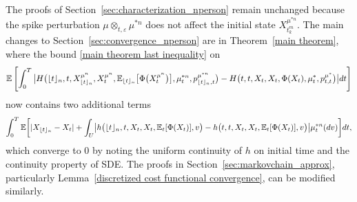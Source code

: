 \documentclass[12pt]{article}
\DeclarePairedDelimiter\floor{\lfloor}{\rfloor}
\theoremstyle{named}
\numberwithin{equation}{section}
\begin{document}
The proofs of Section~\ref{sec:characterization_nperson} remain unchanged because the spike perturbation
$\mu \otimes_{t,\varepsilon} \mu^{*n}$ does not affect the initial state $X^{\mu^{*n} }_{t^m_k}$.
The main changes to Section~\ref{sec:convergence_nperson} are in Theorem~\ref{main theorem},
where the bound \eqref{main theorem last inequality} on
\begin{equation*}
    \mathbb{E}\left[\int_0^T\big| H\bigl(\floor{t}_{n},t,X^{{\mu}^n }_{\floor{t}_{n}},X^{{\mu}^n }_t,\mathbb{E}_{\floor{t}_{n}}\big[ \Phi\big( X^{{\mu}^n }_t \big) \big],\mu^{*n} _t,p^{\mu^{*n} }_{\floor{t}_{n},t}\bigr) - H\bigl(t,t,X_t,X_t,\Phi( X_t ),\mu^*_t,p^{\mu^*}_{t,t}\bigr)\big| dt\right]
\end{equation*}
now contains two additional terms
\begin{equation*}
\int_0^T \mathbb{E} \biggl[
    \lvert X_{\floor{t}_{n}} - X_t \rvert +
    \int_U \bigl| h\bigl(\floor{t}_{n},t,X_{t},X_t,\mathbb{E}_{t}[\Phi(X_t)], v\bigr) - h\bigl(t,t,X_t,X_t,\mathbb{E}_t[\Phi(X_t)], v\bigr)\bigr| \mu^{*n} _t(dv)  \biggr]dt,
\end{equation*}
which converge to $0$ by noting the uniform continuity of $h$ on initial time and the continuity property of SDE.
The proofs in Section~\ref{sec:markovchain_approx}, particularly Lemma~\ref{discretized cost functional convergence}, can be modified similarly.
\end{document}
